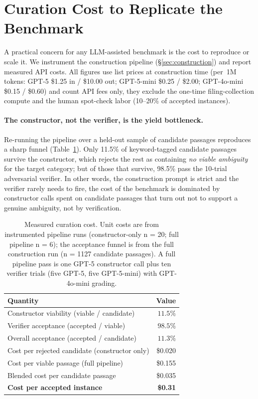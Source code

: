 \section{Curation Cost to Replicate the Benchmark}
\label{app:cost}

A practical concern for any LLM-assisted benchmark is the cost to reproduce or
scale it. We instrument the construction pipeline (\S\ref{sec:construction}) and
report measured API costs. All figures use list prices at construction time
(per~1M tokens: GPT-5 \$1.25 in / \$10.00 out; GPT-5-mini \$0.25 / \$2.00;
GPT-4o-mini \$0.15 / \$0.60) and count API fees only, they exclude the one-time
filing-collection compute and the human spot-check labor (10--20\% of
accepted instances).

\paragraph{The constructor, not the verifier, is the yield bottleneck.}
Re-running the pipeline over a held-out sample of candidate passages reproduces
a sharp funnel (Table~\ref{tab:cost}). Only 11.5\% of keyword-tagged candidate
passages survive the constructor, which rejects the rest as containing
\emph{no viable ambiguity} for the target category; but of those that survive,
98.5\% pass the 10-trial adversarial verifier. In other words, the
construction prompt is strict and the verifier rarely needs to fire, the cost
of the benchmark is dominated by constructor calls spent on candidate passages
that turn out not to support a genuine ambiguity, not by verification.

\begin{table}[!htbp]
\centering

\small
\begin{tabular}{lr}
\toprule
Quantity & Value \\
\midrule
Constructor viability (viable / candidate)      & $11.5\%$ \\
Verifier acceptance (accepted / viable)         & $98.5\%$ \\
Overall acceptance (accepted / candidate)       & $11.3\%$ \\
\midrule
Cost per rejected candidate (constructor only)  & \$0.020 \\
Cost per viable passage (full pipeline)         & \$0.155 \\
Blended cost per candidate passage              & \$0.035 \\
\textbf{Cost per accepted instance}             & \textbf{\$0.31} \\
\bottomrule
\end{tabular}
\caption{Measured curation cost. Unit costs are from instrumented pipeline runs
(constructor-only n = 20; full pipeline n = 6); the acceptance funnel is from
the full construction run (n = 1127 candidate passages). A full pipeline pass
is one GPT-5 constructor call plus ten verifier trials (five GPT-5, five
GPT-5-mini) with GPT-4o-mini grading.}
\label{tab:cost}
\end{table}

